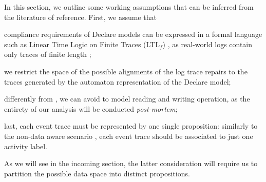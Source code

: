 In this section, we outline some working assumptions that can be inferred from the literature of reference. First, we assume that \begin{enumerate*}[label=\emph{\alph*})]
\item compliance requirements of Declare models can be expressed in a formal language such as Linear Time Logic on Finite Traces (LTL$_f$) \cite{10.1007/978-3-642-40176-3_8}, as real-world logs contain only traces of finite length \cite{GiacomoV13};
\item we restrict the space of the possible alignments of the log trace repairs to the traces generated by the automaton representation of the Declare model;
\item differently from \cite{MultiPerspective}, we can avoid to model reading and writing operation, as the entirety of our analysis will be conducted \textit{post-mortem}; \item last, each event trace must be represented by one single proposition: similarly to the non-data aware scenario \cite{XuLZ17a}, each event trace should be associated to just one activity label. \end{enumerate*} As we will see in the incoming section, the latter consideration will require us to partition the possible data space into distinct propositions.




